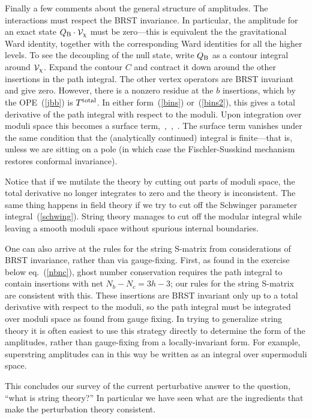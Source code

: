 Finally a few comments about the general structure of amplitudes.
The interactions must respect the BRST invariance.  In particular,
the amplitude for an exact state $Q_{\rm B} \cdot {\cal V}_\chi$
must be zero---this is equivalent the the gravitational Ward
identity, together with the corresponding Ward identities for all
the higher levels.  To see the decoupling of the null state,
write $Q_{\rm B}$ as a contour integral around ${\cal V}_\chi$.
Expand the contour $C$ and contract it down around the other
insertions in the path integral.  The other vertex operators are
BRST invariant and give zero.  However, there is a nonzero residue
at the $b$ insertions, which by the OPE~(\ref{jbb}) is
$T^{\rm total}$.
In either form~(\ref{bins}) or~(\ref{bins2}), this
gives a total derivative of the path integral with respect to the
moduli.  Upon integration
over moduli space this becomes a surface
term\cite{FMS},~\cite{Msrs},~\cite{Gid_PR},~\cite{Mans}.  The
surface term vanishes under the same condition that the
(analytically continued) integral is finite---that is, unless we are
sitting on a pole (in which case the Fischler-Susskind mechanism
restores conformal invariance).

Notice that if we mutilate the theory by cutting out parts of
moduli space, the total derivative no longer integrates to zero and
the theory is inconsistent.  The same thing happens in field
theory if we try to cut off the Schwinger parameter
integral~(\ref{schwing}).  String theory manages to cut off the
modular integral while leaving a smooth moduli space without
spurious internal boundaries.

One can also arrive at the rules for the string S-matrix from
considerations of BRST invariance, rather than via gauge-fixing.
First, as found in the exercise below eq.~(\ref{nbnc}), ghost
number conservation requires the path integral to contain
insertions with net $N_b - N_c = 3h - 3$; our rules for the string
S-matrix are consistent with this.  These insertions
are BRST invariant only up to a total derivative with respect to the
moduli, so the path integral must be integrated over moduli space as
found from gauge fixing.  In trying to generalize string theory it is
often easiest to use this strategy directly to determine the form of
the amplitudes, rather than gauge-fixing from a locally-invariant
form. For example, superstring amplitudes can in this way be written
as an integral over supermoduli space.

This concludes our survey of the current perturbative answer to
the question, ``what is string theory?''  In particular we have
seen what are the ingredients that make the perturbation theory
consistent.

